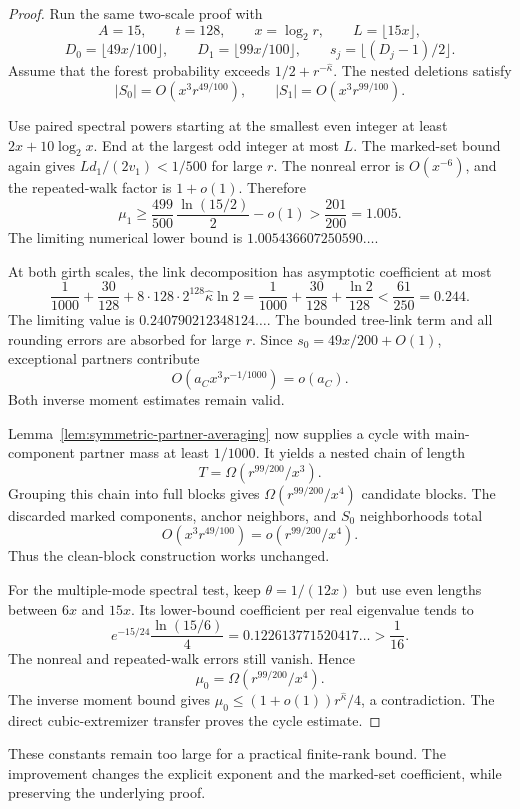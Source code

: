 \begin{proof}
Run the same two-scale proof with
\[
 A=15,\qquad t=128,\qquad x=\log_2r,\qquad L=\lfloor15x\rfloor,
\]
\[
 D_0=\lfloor49x/100\rfloor,\qquad
 D_1=\lfloor99x/100\rfloor,
 \qquad s_j=\lfloor(D_j-1)/2\rfloor.
\]
Assume that the forest probability exceeds $1/2+r^{-\widehat\kappa}$.
The nested deletions satisfy
\[
 |S_0|=O(x^3r^{49/100}),\qquad
 |S_1|=O(x^3r^{99/100}).
\]

Use paired spectral powers starting at the smallest even integer at least $2x+10\log_2x$.
End at the largest odd integer at most $L$.
The marked-set bound again gives $Ld_1/(2v_1)<1/500$ for large $r$.
The nonreal error is $O(x^{-6})$, and the repeated-walk factor is $1+o(1)$.
Therefore
\[
 \mu_1\ge\frac{499}{500}\,\frac{\ln(15/2)}2-o(1)
 >\frac{201}{200}=1.005.
\]
The limiting numerical lower bound is $1.005436607250590\ldots$.

At both girth scales, the link decomposition has asymptotic coefficient at most
\[
 \frac1{1000}+\frac{30}{128}
       +8\cdot128\cdot2^{128}\widehat\kappa\ln2
 =\frac1{1000}+\frac{30}{128}+\frac{\ln2}{128}
 <\frac{61}{250}=0.244.
\]
The limiting value is $0.240790212348124\ldots$.
The bounded tree-link term and all rounding errors are absorbed for large $r$.
Since $s_0=49x/200+O(1)$, exceptional partners contribute
\[
 O(a_Cx^3r^{-1/1000})=o(a_C).
\]
Both inverse moment estimates remain valid.

Lemma~\ref{lem:symmetric-partner-averaging} now supplies a cycle with main-component partner mass at least $1/1000$.
It yields a nested chain of length
\[
 T=\Omega(r^{99/200}/x^3).
\]
Grouping this chain into full blocks gives $\Omega(r^{99/200}/x^4)$ candidate blocks.
The discarded marked components, anchor neighbors, and $S_0$ neighborhoods total
\[
 O(x^3r^{49/100})=o(r^{99/200}/x^4).
\]
Thus the clean-block construction works unchanged.

For the multiple-mode spectral test, keep $\theta=1/(12x)$ but use even lengths between $6x$ and $15x$.
Its lower-bound coefficient per real eigenvalue tends to
\[
 e^{-15/24}\frac{\ln(15/6)}4
 =0.122613771520417\ldots>\frac1{16}.
\]
The nonreal and repeated-walk errors still vanish.
Hence
\[
 \mu_0=\Omega(r^{99/200}/x^4).
\]
The inverse moment bound gives $\mu_0\le(1+o(1))r^{\widehat\kappa}/4$, a contradiction.
The direct cubic-extremizer transfer proves the cycle estimate.
\end{proof}

These constants remain too large for a practical finite-rank bound.
The improvement changes the explicit exponent and the marked-set coefficient, while preserving the underlying proof.
